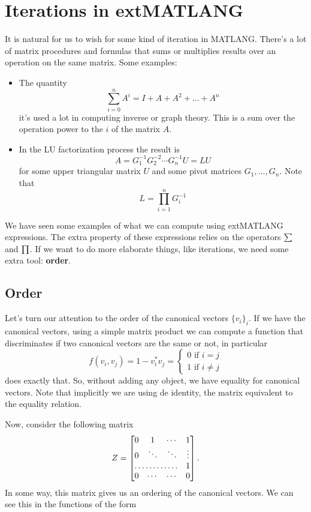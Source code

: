 \section{Iterations in extMATLANG}
It is natural for us to wish for some kind of iteration in MATLANG. There's a lot of matrix procedures and formulas that sums or multiplies results over an operation on the same matrix. Some examples:
\begin{itemize}
	\item The quantity $$\sum_{i=0}^nA^i=I+A+A^2+\ldots + A^n$$ it's used a lot in computing inverse or graph theory. This is a sum over the operation power to the $i$ of the matrix $A$.
	\item In the LU factorization process the result is $$A=G_1^{-1}G_2^{-2}\cdots G_n^{-1}U=LU$$ for some upper triangular matrix $U$ and some pivot matrices $G_1, \ldots, G_n$. Note that $$L=\prod_{i=1}^nG_{i}^{-1}$$
\end{itemize}

We have seen some examples of what we can compute using extMATLANG expressions. The extra property of these expressions relies on the operators $\textstyle\sum$ and $\textstyle\prod$. If we want to do more elaborate things, like iterations, we need some extra tool: \textbf{order}.

\subsection{Order}

Let's turn our attention to the order of the canonical vectors $\lbrace v_i\rbrace_i$. If we have the canonical vectors, using a simple matrix product we can compute a function that discriminates if two canonical vectors are the same or not, in particular
\[
  			f(v_i,v_j)=1-v_i^*v_j=\begin{cases}
               0 \text{ if } i=j \\
               1 \text{ if } i\neq j
            \end{cases}
		\]
does exactly that. So, without adding any object, we have equality for canonical vectors. Note that implicitly we are using de identity, the matrix equivalent to the equality relation.


Now, consider the following matrix
\[
Z = \begin{bmatrix}
    0 & 1 & \cdots &  1 \\
    0 & \ddots & \ddots & \vdots \\
    \hdotsfor{3} & 1 \\
    0 & \cdots & \cdots & 0 
\end{bmatrix}.
\]
In some way, this matrix gives us an ordering of the canonical vectors. We can see this in the functions of the form 

